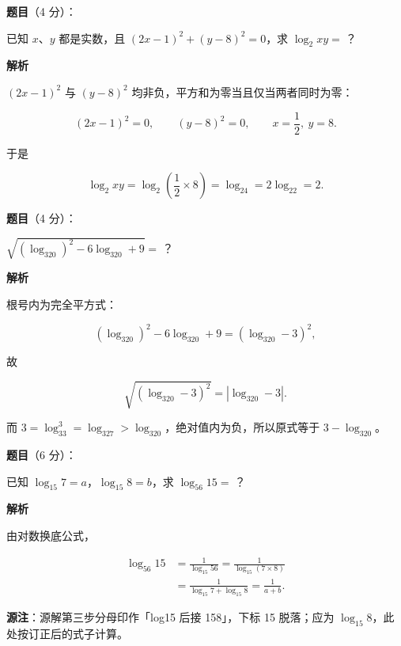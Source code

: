 \begin{answer}

\textbf{题目}（4 分）：

已知 $x$、$y$ 都是实数，且 $(2x-1)^2+(y-8)^2=0$，求 $\log_2xy=\ \text{？}$

\textbf{解析}

$(2x-1)^2$ 与 $(y-8)^2$ 均非负，平方和为零当且仅当两者同时为零：

\nopagebreak[4]
\[
(2x-1)^2=0,\qquad (y-8)^2=0,
\qquad x=\frac12,\ y=8.
\]

于是

\nopagebreak[4]
\[
\log_2xy=\log_2\!\left(\frac12\times8\right)=\log_24=2\log_22=2.
\]


\end{answer}
\begin{answer}

\textbf{题目}（4 分）：

$\sqrt{(\log_320)^2-6\log_320+9}=\ \text{？}$

\textbf{解析}

根号内为完全平方式：

\nopagebreak[4]
\[
(\log_320)^2-6\log_320+9=(\log_320-3)^2,
\]

故

\nopagebreak[4]
\[
\sqrt{(\log_320-3)^2}=|\log_320-3|.
\]

而 $3=\log_33^3=\log_327>\log_320$，绝对值内为负，所以原式等于 $3-\log_320$。


\end{answer}
\begin{answer}

\textbf{题目}（6 分）：

已知 $\log_{15}7=a$，$\log_{15}8=b$，求 $\log_{56}15=\ \text{？}$

\textbf{解析}

由对数换底公式，

\nopagebreak[4]
\[
\begin{aligned}
\log_{56}15&=\frac{1}{\log_{15}56}
=\frac{1}{\log_{15}(7\times8)}\\
&=\frac{1}{\log_{15}7+\log_{15}8}
=\frac{1}{a+b}.
\end{aligned}
\]

\begin{gktip}
\textbf{源注}：源解第三步分母印作「log15 后接 158」，下标 15 脱落；应为 $\log_{15}8$，此处按订正后的式子计算。
\end{gktip}


\end{answer}
